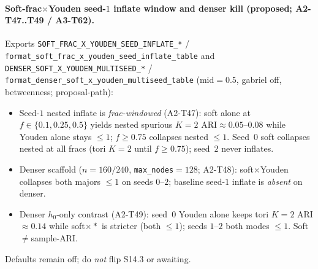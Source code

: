 \documentclass[11pt]{article}
\begin{document}
\paragraph{Soft-frac$\times$Youden seed-$1$ inflate window and denser kill
(proposed; A2-T47..T49 / A3-T62).}
Exports \texttt{SOFT\_FRAC\_X\_YOUDEN\_SEED\_INFLATE\_*} /
\texttt{format\_soft\_frac\_x\_youden\_seed\_inflate\_table} and
\texttt{DENSER\_SOFT\_X\_YOUDEN\_MULTISEED\_*} /
\texttt{format\_denser\_soft\_x\_youden\_multiseed\_table}
(mid${=}0.5$, gabriel off, betweenness; proposal-path):
\begin{itemize}[leftmargin=1.5em]
  \item Seed-$1$ nested inflate is \emph{frac-windowed} (A2-T47): soft
  alone at $f\in\{0.1,0.25,0.5\}$ yields nested spurious $K{=}2$
  ARI$\approx 0.05$--$0.08$ while Youden alone stays $\le 1$; $f\ge 0.75$
  collapses nested $\le 1$. Seed~$0$ soft collapses nested at all fracs
  (tori $K{=}2$ until $f\ge 0.75$); seed~$2$ never inflates.
  \item Denser scaffold ($n{=}160/240$, \texttt{max\_nodes}${=}128$;
  A2-T48): soft$\times$Youden collapses both majors $\le 1$ on seeds
  $0$--$2$; baseline seed-$1$ inflate is \emph{absent} on denser.
  \item Denser $h_0$-only contrast (A2-T49): seed~$0$ Youden alone keeps
  tori $K{=}2$ ARI$\approx 0.14$ while soft$\times*$ is stricter
  (both $\le 1$); seeds $1$--$2$ both modes $\le 1$. Soft$\neq$sample-ARI.
\end{itemize}
Defaults remain off; do \emph{not} flip S14.3 or awaiting.
\end{document}
